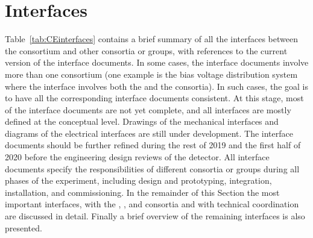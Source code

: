\section{Interfaces}
\label{sec:fdsp-tpcelec-interfaces}

Table~\ref{tab:CEinterfaces} contains a brief summary of all the interfaces
between the  consortium and other consortia or groups,
with references to the current version of the interface documents. 
In some cases, the interface documents involve more than one 
consortium (one example is the bias voltage distribution system where
the interface involves both the  and the  consortia).
In such cases, the goal is to have all the corresponding interface documents 
consistent. At this stage, most of the interface documents are
not yet complete, and all interfaces are mostly defined at the conceptual
level. Drawings of the mechanical interfaces and diagrams
of the electrical interfaces are still under development. The interface 
documents should be further refined during the rest of 2019 and the 
first half of 2020 before the engineering design
reviews of the detector. All interface documents specify the responsibilities
of different consortia or groups during all phases of the experiment,
including design and prototyping, integration, installation,
and commissioning. In the remainder of this Section the most
important interfaces, with the , , and 
consortia and with technical coordination are discussed in detail.
Finally a brief overview of the remaining interfaces is also presented.


